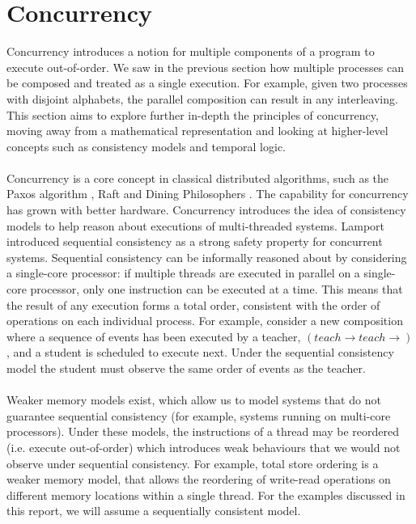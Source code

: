 \section{Concurrency} \label{sec:concurrency}
Concurrency introduces a notion for multiple components of a program to execute out-of-order. We saw in the previous section how multiple processes can be composed and treated as a single execution. For example, given two processes with disjoint alphabets, the parallel composition can result in any interleaving. This section aims to explore further in-depth the principles of concurrency, moving away from a mathematical representation and looking at higher-level concepts such as consistency models and temporal logic. 
\\ \\
Concurrency is a core concept in classical distributed algorithms, such as the Paxos algorithm \cite{basic_paxos}, Raft \cite{raft} and Dining Philosophers \cite{dining_philosophers}. The capability for concurrency has grown with better hardware. Concurrency introduces the idea of consistency models \cite{art_of_multiprocessor_programming} to help reason about executions of multi-threaded systems. Lamport introduced sequential consistency \cite{sc} as a strong safety property for concurrent systems. Sequential consistency can be informally reasoned about by considering a single-core processor: if multiple threads are executed in parallel on a single-core processor, only one instruction can be executed at a time. This means that the result of any execution forms a total order, consistent with the order of operations on each individual process. For example, consider a new composition where a sequence of events has been executed by a teacher, \((teach \rightarrow teach \rightarrow)\), and a student is scheduled to execute next. Under the sequential consistency model the student must observe the same order of events as the teacher.
\\ \\
Weaker memory models exist, which allow us to model systems that do not guarantee sequential consistency (for example, systems running on multi-core processors). Under these models, the instructions of a thread may be reordered (i.e. execute out-of-order) which introduces weak behaviours that we would not observe under sequential consistency. For example, total store ordering is a weaker memory model, that allows the reordering of write-read operations on different memory locations within a single thread. For the examples discussed in this report, we will assume a sequentially consistent model.

